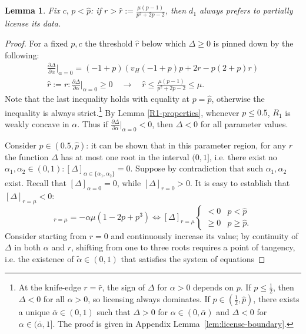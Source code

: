 \documentclass[11pt]{article}
\theoremstyle{plain}
\theoremstyle{definition}
\theoremstyle{plain}
\theoremstyle{plain}
\theoremstyle{plain}
\newtheorem{lem}[thm]{Lemma}
\theoremstyle{plain}
\numberwithin{equation}{section}
\begin{document}
\begin{lem}
   Fix $c, \, p < \hat{p}$: if $r > \hat{r}:= \frac{\mu (p-1)}{ p^2 + 2 p -2}$, then $d_1$ always prefers to partially license its data. 
\end{lem}
\begin{proof}
    For a fixed $p,c$ the threshold $\hat{r}$ below which $\Delta \geq 0$ is pinned down by the following:
    \begin{align*}
    \frac{\partial \Delta}{\partial \alpha} \bigg|_{\alpha = 0} = (-1 + p) (v_H (-1 + p) p + 2 r - p (2 + p) r) \\[5pt]
    \hat{r}:=r: \frac{\partial \Delta}{\partial \alpha} \bigg|_{\alpha = 0} \geq 0 \quad \to \quad \hat{r} \leq  \frac{\mu (p-1)}{p^2 + 2 p -2} \leq \mu.
\end{align*}
Note that the last inequality holds with equality at $p = \hat{p}$, otherwise the inequality is always strict.\footnote{At the knife-edge $r = \hat{r}$, the sign of $\Delta$ for $\alpha > 0$ depends on $p$. If $p \leq \frac{1}{2}$, then $\Delta < 0$ for all $\alpha > 0$, so licensing always dominates. If $p \in \left(\frac{1}{2}, \hat{p}\right)$, there exists a unique $\bar{\alpha} \in (0,1)$ such that $\Delta > 0$ for $\alpha \in (0,\bar{\alpha})$ and $\Delta < 0$ for $\alpha \in (\bar{\alpha},1]$. The proof is given in Appendix Lemma~\ref{lem:license-boundary}.} By Lemma \ref{R1-properties}, whenever $p \leq 0.5$, $R_1$ is weakly concave in $\alpha$. Thus if $\frac{\partial \Delta}{\partial \alpha} \big|_{\alpha = 0}<0$, then $\Delta<0$ for all parameter values. \par 
\noindent Consider $p \in (0.5, \hat{p})$: it can be shown that in this parameter region, for any $r$ the function $\Delta$ has at most one root in the interval $(0, 1]$, i.e. there exist no $ \alpha_1,\alpha_2 \in (0,1) : [\Delta]_{\alpha \in \{\alpha_1,\alpha_2\}} = 0$. Suppose by contradiction that such $\alpha_1,\alpha_2$ exist. Recall that $[\Delta]_{\alpha = 0}=0$, while $[\Delta]_{r = 0}>0$. It is easy to establish that $[\Delta]_{r = \mu}<0$:
\begin{equation*}
    [\Delta]_{r=\mu} = -\alpha \mu (1 - 2 p + p^3) \iff [\Delta]_{r=\mu} \begin{cases}
        < 0 & p < \hat{p} \\
        \geq 0 & p \geq \hat{p}.
    \end{cases}
\end{equation*}
Consider starting from $r = 0$ and continuously increase its value; by continuity of $\Delta$ in both $\alpha$ and $r$, shifting from one to three roots requires a point of tangency, i.e. the existence of $ \tilde{\alpha} \in (0,1)$ that satisfies the system of equations

\end{proof}
\end{document}
